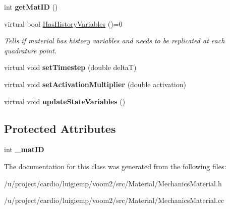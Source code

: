 \begin{DoxyCompactItemize}
\item 
\hypertarget{classvoom_1_1_mechanics_material_ac2337249b845f90695efdec24b61b4c8}{
int {\bfseries getMatID} ()}
\label{classvoom_1_1_mechanics_material_ac2337249b845f90695efdec24b61b4c8}

\item 
\hypertarget{classvoom_1_1_mechanics_material_a3c962d203b86f8ea092e8a754c01e2cb}{
virtual bool \hyperlink{classvoom_1_1_mechanics_material_a3c962d203b86f8ea092e8a754c01e2cb}{HasHistoryVariables} ()=0}
\label{classvoom_1_1_mechanics_material_a3c962d203b86f8ea092e8a754c01e2cb}

\begin{DoxyCompactList}\small\item\em Tells if material has history variables and needs to be replicated at each quadrature point. \item\end{DoxyCompactList}\item 
\hypertarget{classvoom_1_1_mechanics_material_a62f35b54a8a6b590fd6662e8b55d9db9}{
virtual void {\bfseries setTimestep} (double deltaT)}
\label{classvoom_1_1_mechanics_material_a62f35b54a8a6b590fd6662e8b55d9db9}

\item 
\hypertarget{classvoom_1_1_mechanics_material_a75b6c9b2df647b98b4bb09e7e3cfecc5}{
virtual void {\bfseries setActivationMultiplier} (double activation)}
\label{classvoom_1_1_mechanics_material_a75b6c9b2df647b98b4bb09e7e3cfecc5}

\item 
\hypertarget{classvoom_1_1_mechanics_material_a8311a571d358803ff8c9d70ce060984b}{
virtual void {\bfseries updateStateVariables} ()}
\label{classvoom_1_1_mechanics_material_a8311a571d358803ff8c9d70ce060984b}

\end{DoxyCompactItemize}
\subsection*{Protected Attributes}
\begin{DoxyCompactItemize}
\item 
\hypertarget{classvoom_1_1_mechanics_material_a62ee931a1815b63a8e70cdf3c89ef680}{
int {\bfseries \_\-matID}}
\label{classvoom_1_1_mechanics_material_a62ee931a1815b63a8e70cdf3c89ef680}

\end{DoxyCompactItemize}


The documentation for this class was generated from the following files:\begin{DoxyCompactItemize}
\item 
/u/project/cardio/luigiemp/voom2/src/Material/MechanicsMaterial.h\item 
/u/project/cardio/luigiemp/voom2/src/Material/MechanicsMaterial.cc\end{DoxyCompactItemize}
